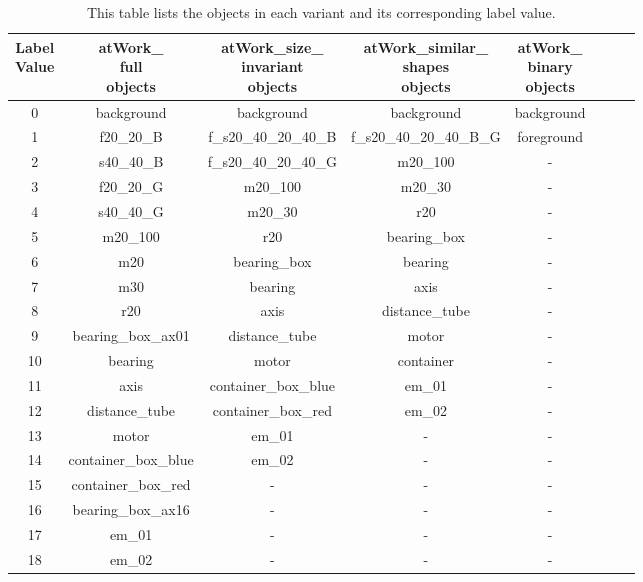 \begin{itemize}
		\begin{table}
			\centering
			\begin{tabular}{|c|c|c|c|c|c|c|c|}
			\hline 
  			\makecell{Label \\Value} & \makecell{atWork\_\\full \\ objects} & \makecell{atWork\_size\_\\invariant \\ objects} & \makecell{atWork\_similar\_\\shapes \\ objects} & \makecell{atWork\_\\binary \\ objects} \\ 
			\hline
			0 & background & background & background & background \\ 
			\hline
			1 & f20\_20\_B & f\_s20\_40\_20\_40\_B & f\_s20\_40\_20\_40\_B\_G & foreground \\ 
			\hline
			2 & s40\_40\_B & f\_s20\_40\_20\_40\_G & m20\_100 & - \\ 
			\hline
			3 & f20\_20\_G & m20\_100 & m20\_30 & - \\ 
			\hline
			4 & s40\_40\_G & m20\_30 & r20 & - \\ 
			\hline
			5 & m20\_100 & r20 & bearing\_box & - \\ 
			\hline
			6 & m20 & bearing\_box & bearing & - \\ 
			\hline
			7 & m30 & bearing & axis & - \\ 
			\hline
			8 & r20 & axis & distance\_tube & - \\ 
			\hline	
			9 & bearing\_box\_ax01 & distance\_tube & motor & - \\ 
			\hline		
			10 & bearing & motor & container & - \\ 
			\hline
			11 & axis & container\_box\_blue & em\_01 & - \\ 
			\hline
			12 & distance\_tube & container\_box\_red & em\_02 & - \\ 
			\hline
			13 & motor & em\_01 & - & - \\ 
			\hline
			14 & container\_box\_blue & em\_02 & - & - \\ 
			\hline
			15 & container\_box\_red & - & - & - \\ 
			\hline
			16 & bearing\_box\_ax16 & - & - & - \\ 
			\hline
			17 & em\_01 & - & - & - \\ 
			\hline
			18 & em\_02 & - & - & - \\ 
			\hline
			\end{tabular}
			\caption{This table lists the objects in each variant and its corresponding label value.} 
			\label{Table:variants}
		\end{table}
		
	\end{itemize}

